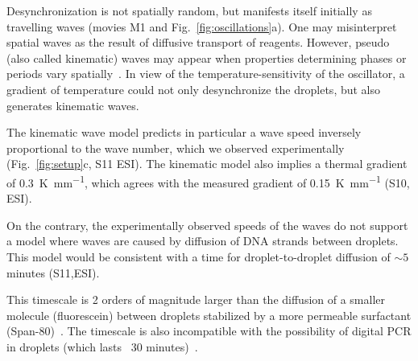 \documentclass[prl,aps,reprint,
 amsmath,amssymb,superscriptaddress]{revtex4-1}
\begin{document}
Desynchronization is not spatially random, but manifests itself initially as travelling waves (movies  M1 and Fig.~\ref{fig:oscillations}a). One may misinterpret spatial waves as the result of diffusive transport of reagents. However, pseudo (also called kinematic) waves may appear when properties determining phases or periods vary spatially~\cite{Kopell1973}. In view of the temperature-sensitivity of the oscillator, a gradient of temperature could not only desynchronize the droplets, but also generates kinematic waves. 

	The kinematic wave model predicts in particular a wave speed inversely proportional to the wave number, which we observed experimentally (Fig.~\ref{fig:setup}c, S11 ESI). The kinematic model also implies a thermal gradient of \SI{0.3}{\kelvin\per\milli\metre}, which agrees with the measured gradient of \SI{0.15}{\kelvin\per\milli\metre} (S10, ESI).
	
	On the contrary, the experimentally observed speeds of the waves do not support a model where waves are caused by diffusion of DNA strands between droplets. This model would be consistent with a time for droplet-to-droplet diffusion of $\sim 5$ minutes (S11,ESI). 
	
This timescale is 2 orders of magnitude larger than the diffusion of a smaller molecule (fluorescein) between droplets stabilized by a more permeable surfactant (Span-80)~\cite{Bai2010}. The timescale is also incompatible with the possibility of digital PCR in droplets (which lasts ~30 minutes)~\cite{Pekin2011}.
\end{document}

